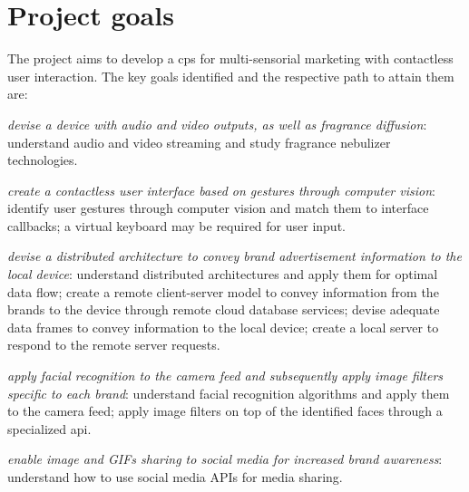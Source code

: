 \section{Project goals}%
\label{sec:project-goals}
The project aims to develop a \gls{cps} for multi-sensorial marketing with
contactless user interaction. The key goals identified and the respective path
to attain them are:
\begin{enum-c}
\item \emph{devise a device with audio and video outputs, as well as fragrance
    diffusion}: understand audio and video streaming and study fragrance
  nebulizer technologies.
\item \emph{create a contactless user interface based on gestures through
    computer vision}: identify user gestures through computer vision and match them to interface
  callbacks; a virtual keyboard may be required for user input.
\item \emph{devise a distributed architecture to convey brand advertisement
  information to the local device}: understand distributed architectures and
apply them for optimal data flow; create a remote client-server model to convey
information from the brands to the device through remote cloud database
services; devise adequate data frames to convey information to the local device;
create a local server to respond to the remote server requests.
\item \emph{apply facial recognition to the camera feed and subsequently apply
  image filters specific to each brand}: understand facial recognition
algorithms and apply them to the camera feed; apply image filters on top of the
identified faces through a specialized \gls{api}.
\item \emph{enable image and GIFs sharing to social media for increased brand
    awareness}: understand how to use social media APIs for media sharing.
\end{enum-c}
%
